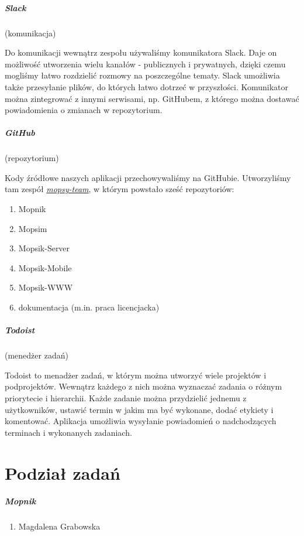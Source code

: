 \paragraph{Slack}(komunikacja)

Do komunikacji wewnątrz zespołu używaliśmy komunikatora Slack. Daje on możliwość utworzenia wielu kanałów - publicznych i prywatnych, dzięki czemu mogliśmy łatwo rozdzielić rozmowy na poszczególne tematy. Slack umożliwia także przesyłanie plików, do których łatwo dotrzeć w przyszłości. Komunikator można zintegrować z innymi serwisami, np. GitHubem, z którego można dostawać powiadomienia o zmianach w repozytorium.

\paragraph{GitHub}(repozytorium)

Kody źródłowe naszych aplikacji przechowywaliśmy na GitHubie. Utworzyliśmy tam zespół \href{https://github.com/mopsy-team}{\textit{mopsy-team}}, w którym powstało sześć repozytoriów:
\begin{enumerate}
\item Mopnik
\item Mopsim
\item Mopsik-Server
\item Mopsik-Mobile
\item Mopsik-WWW
\item dokumentacja (m.in. praca licencjacka)
\end{enumerate}

\paragraph{Todoist}(menedżer zadań)

Todoist to menadżer zadań, w którym można utworzyć wiele projektów i podprojektów. Wewnątrz każdego z nich można wyznaczać zadania o różnym priorytecie i hierarchii. Każde zadanie można przydzielić jednemu z użytkowników, ustawić termin w jakim ma być wykonane, dodać etykiety i komentować. Aplikacja umożliwia wysyłanie powiadomień o nadchodzących terminach i wykonanych zadaniach.


\chapter{Podział zadań}
\paragraph{Mopnik}
\begin{enumerate}
\item Magdalena Grabowska
\end{enumerate}


